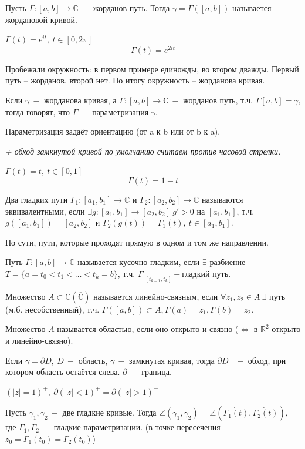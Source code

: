 Пусть $\Gamma: [a, b] \to \mathbb{C} \ - $ жорданов путь. Тогда $\gamma = \Gamma([a,b])$ называется жордановой кривой.

 $\Gamma(t) = e^{it}, \ t \in [0, 2\pi]$
\[\Gamma(t) = e^{2it}\]

Пробежали окружность: в первом примере единожды, во втором дважды. Первый путь -- жорданов, второй нет. По итогу окружность -- жорданова кривая.

 Если $\gamma \ -$ жорданова кривая, а $\Gamma:[a,b]\to \mathbb{C} \ -$ жорданов путь, т.ч. $\Gamma[a,b]=\gamma$, тогда говорят, что $\Gamma \ -$ параметризация $\gamma$.

Параметризация задаёт ориентацию (от a к b или от b к a).

\textit{+ обход замкнутой кривой по умолчанию считаем против часовой стрелки.}

 $\Gamma(t) = t, \ t \in [0, 1]$
\[\Gamma(t) = 1-t\]

 Два гладких пути $\Gamma_1 : [a_1, b_1]\to \mathbb{C}$ и $\Gamma_2 : [a_2, b_2] \to \mathbb{C}$ называются эквивалентными, если $\exists g : [a_1, b_1] \to [a_2, b_2] \ g' > 0$ на $[a_1, b_1]$, т.ч. $g([a_1, b_1])=[a_2, b_2]$ и $\Gamma_2(g(t)) = \Gamma_1(t), \ t \in [a_1, b_1]$.

По сути, пути, которые проходят прямую в одном и том же направлении.

 Путь $\Gamma:[a,b] \to \mathbb{C}$ называется кусочно-гладким, если $\exists$ разбиение $T = \{a=t_0<t_1<\ldots<t_k=b\}$, т.ч. $\Gamma|_{[t_{k-1}, t_k]}-$гладкий путь.

 Множество $A \subset \mathbb{C} (\overline{\mathbb{C}})$ называется линейно-связным, если $\forall z_1, z_2 \in A \ \exists$ путь (м.б. несобственный), т.ч. $\Gamma([a,b])\subset A, \Gamma(a) = z_1, \Gamma(b) = z_2$.

 Множество $A$ называется областью, если оно открыто и связно ($\Leftrightarrow$ в $\mathbb{R}^2$ открыто и линейно-связно).

 Если $\gamma = \partial D, \ D \ -$ область, $\gamma \ -$ замкнутая кривая, тогда $\partial D^+ \ - $ обход, при котором область остаётся слева. $\partial \ -$ граница.

 $(|z|=1)^+, \ \partial(|z|<1)^+=\partial (|z|>1)^-$

 Пусть $\gamma_1, \gamma_2 \ -$ две гладкие кривые. Тогда $\angle(\gamma_1, \gamma_2) = \angle(\dot{\Gamma_1(t)}, \dot{\Gamma_2(t)})$, где $\Gamma_1, \Gamma_2 \ -$ гладкие параметризации. (в точке пересечения $z_0 = \Gamma_1(t_0) = \Gamma_2(t_0)$)

